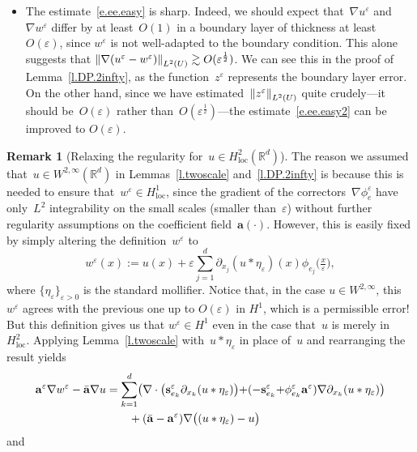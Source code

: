 \documentclass[11pt]{article} %
\numberwithin{equation}{section}
\theoremstyle{definition}
\newtheorem{remark}[theorem]{Remark}
\let\originalleft\left
\let\originalright\right
\renewcommand{\left}{\mathopen{}\mathclose\bgroup\originalleft}
\renewcommand{\right}{\aftergroup\egroup\originalright}
\newcommand*{\Rd}{\ensuremath{\mathbb{R}^d}}
\newcommand{\eps}{\varepsilon}
\newcommand{\s}{\mathbf{s}}
\newcommand{\ep}{\eps}
\renewcommand{\a}{\mathbf{a}}
\newcommand{\ahom}{\bar{\a}}
\begin{document}
\begin{itemize}
\item
The estimate~\eqref{e.ee.easy} is sharp. Indeed, we should expect that~$\nabla u^\ep$ and~$\nabla w^\ep$ differ by at least~$O(1)$ in a boundary layer of thickness at least~$O(\ep)$, since $w^\ep$ is not well-adapted to the boundary condition. This alone suggests that $\left\| \nabla (u^\ep-w^\ep) \right\|_{L^2(U)} \gtrsim O(\ep^{\frac12})$. We can see this in the proof of Lemma~\ref{l.DP.2infty}, as the function~$z^\ep$ represents the boundary layer error. On the other hand, since we have estimated~$\left\| z^\ep \right\|_{L^2(U)}$ quite crudely---it should be~$O(\ep)$ rather than~$O(\ep^{\frac12})$---the estimate~\eqref{e.ee.easy2} can be improved to $O(\ep)$. 
\end{itemize} 

\begin{remark}[{Relaxing the regularity for~$u\in H^2_{\mathrm{loc}}(\Rd)$}]
\label{r.twoscale.H2}
The reason we assumed that~$u\in W^{2,\infty}(\Rd)$ in Lemmas~\ref{l.twoscale} and~\ref{l.DP.2infty} is because this is needed to ensure that~$w^\ep \in H^1_{\mathrm{loc}}$, since the gradient of the correctors~$\nabla \phi_e^\ep$ have only~$L^2$ integrability on the small scales (smaller than~$\ep$) without further regularity assumptions on the coefficient field~$\a(\cdot)$. However, this is easily fixed by simply altering the definition~$w^\ep$ to
\begin{equation}
\label{e.twoscale.mollify}
w^\ep (x)
:=
u(x) 
+ 
\ep \sum_{j=1}^d \partial_{x_j}( u \ast \eta_\ep) (x) \phi_{e_j}\bigl( \tfrac x\ep\bigr),
\end{equation}
where $\{ \eta_\ep \}_{\ep>0}$ is the standard mollifier. Notice that, in the case $u\in W^{2,\infty}$, this $w^\ep$ agrees with the previous one up to $O(\ep)$ in $H^1$, which is a permissible error! But this definition gives us that $w^\ep\in H^1$ even in the case that~$u$ is merely in~$H^2_{\mathrm{loc}}$. Applying Lemma~\ref{l.twoscale} with~$ u \ast \eta_\ep$ in place of~$u$ and rearranging the result yields
\begin{align}
\label{e.twoscale.flux.H2}
\a^\ep \nabla w^\ep - \ahom\nabla u
&
=
\sum_{k=1}^d \left( 
\nabla \cdot \bigl ( \s^\ep_{e_k}  \partial_{x_k} (u\ast\eta_\ep)  \bigr) 
{+}
(- \s^\ep_{e_k} {+} \phi_{e_k}^\ep \a^\ep ) \nabla \partial_{x_k} (u\ast\eta_\ep)  
\right)
\notag \\ 
& \qquad  
+ (\ahom-\a^\ep) \nabla \bigl( (u\ast\eta_\ep) -u \bigr)
\end{align}
and
\begin{equation}

\end{equation}
\end{remark}
\end{document}
